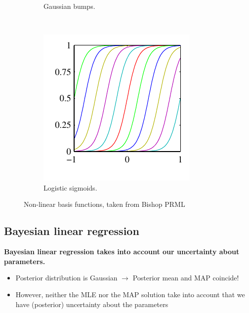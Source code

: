\begin{figure}
\begin{subfigure}[b]{0.3\textwidth}
                \caption{Gaussian bumps.}
    \end{subfigure}%
	~
	\begin{subfigure}[b]{0.3\textwidth}
                \centering
                \includegraphics[width=\textwidth]{./lecture5/Figure31c.pdf}
                \caption{Logistic sigmoids.}
    \end{subfigure}%
    \caption{Non-linear basis functions, taken from Bishop PRML}
\end{figure}


\subsection{Bayesian linear regression}


\textbf{Bayesian linear regression takes into account our uncertainty about parameters.}

\begin{itemize}
\item Posterior distribution is Gaussian $\rightarrow$ Posterior mean and MAP coincide!
\item  However, neither the MLE nor the MAP solution take into account that we have (posterior) uncertainty about the parameters
\end{itemize}


